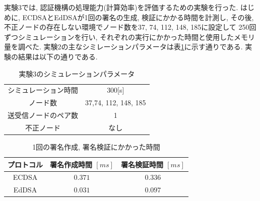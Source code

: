 \indent 実験3では, 認証機構の処理能力(計算効率)を評価するための実験を行った. 
はじめに, ECDSAとEdDSAが1回の署名の生成, 検証にかかる時間を計測し, 
その後, 不正ノードの存在しない環境でノード数を37, 74, 112, 148, 185に設定して
250回ずつシミュレーションを行い, それぞれの実行にかかった時間と使用したメモリ量を調べた. 
実験2の主なシミレーションパラメータは表\ref{tab:exp3-params}に示す通りである. 
\indent 実験の結果は以下の通りである. 
\begin{longtable}{cc}
  \caption{実験3のシミュレーションパラメータ}
  \label{tab:exp3-params}
  \endfirsthead
  \hline
  シミュレーション時間 & 300[s] \\
  ノード数 & 37,74, 112, 148, 185 \\
  送受信ノードのペア数 & 1 \\ 
  不正ノード & なし \\ \hline
\end{longtable}

\begin{longtable}{c|cc}
  \caption{1回の署名作成, 署名検証にかかった時間}
  \label{tab:exp3_sigtime} \\
  \endfirsthead
  \hline
  プロトコル & 署名作成時間 $[ms]$ & 署名検証時間 $[ms]$ \\ \hline
  ECDSA & $0.371$ & $0.336$ \\
  EdDSA & $0.031$ & $0.097$ \\ \hline
\end{longtable}


